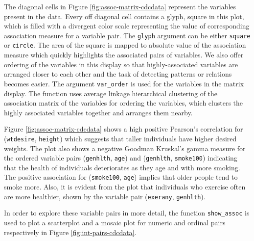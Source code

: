 The diagonal cells in Figure \ref{fig:assoc-matrix-cdcdata} represent
the variables present in the data. Every off diagonal cell contains a
glyph, square in this plot, which is filled with a divergent color scale
representing the value of corresponding association measure for a
variable pair. The \texttt{glyph} argument can be either \texttt{square}
or \texttt{circle}. The area of the square is mapped to absolute value
of the association measure which quickly highlights the associated pairs
of variables. We also offer ordering of the variables in this display so
that highly-associated variables are arranged closer to each other and
the task of detecting patterns or relations becomes easier. The argument
\texttt{var\_order} is used for the variables in the matrix display. The
function uses average linkage hierarchical clustering of the association
matrix of the variables for ordering the variables, which clusters the
highly associated variables together and arranges them nearby.

Figure \ref{fig:assoc-matrix-cdcdata} shows a high positive Pearson's
correlation for (\texttt{wtdesire}, \texttt{height}) which suggests that
taller individuals have higher desired weights. The plot also shows a
negative Goodman Kruskal's gamma measure for the ordered variable pairs
(\texttt{genhlth}, \texttt{age}) and (\texttt{genhlth},
\texttt{smoke100}) indicating that the health of individuals
deteriorates as they age and with more smoking. The positive association
for (\texttt{smoke100}, \texttt{age}) implies that older people tend to
smoke more. Also, it is evident from the plot that individuals who
exercise often are more healthier, shown by the variable pair
(\texttt{exerany}, \texttt{genhlth}).

In order to explore these variable pairs in more detail, the function
\texttt{show\_assoc} is used to plot a scatterplot and a mosaic plot for
numeric and ordinal pairs respectively in Figure
\ref{fig:int-pairs-cdcdata}.

